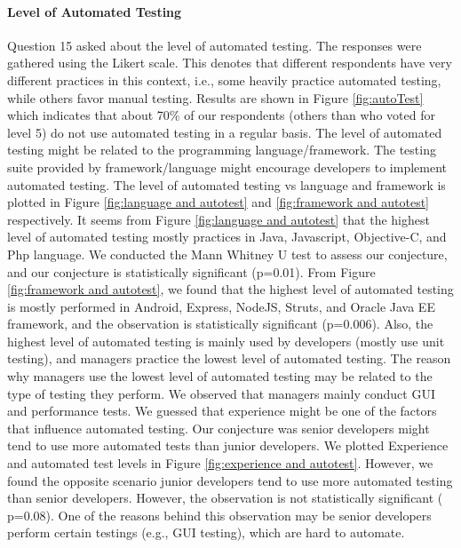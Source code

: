\paragraph{Level of Automated Testing}
Question 15 asked about the level of automated testing. The responses were gathered using the Likert scale. This denotes that different respondents have very different practices in this context, i.e., some heavily practice automated testing, while others favor manual testing.  Results are shown in Figure \ref{fig:autoTest} which indicates that about 70\% of our respondents (others than who voted for level 5) do not use automated testing in a regular basis. The level of automated testing might be related to the programming language/framework. The testing suite provided by framework/language might encourage developers to implement automated testing. The level of automated testing vs language and framework is plotted in Figure \ref{fig:language and autotest} and \ref{fig:framework and autotest} respectively. It seems from Figure \ref{fig:language and autotest} that the highest level of automated testing mostly practices in Java, Javascript, Objective-C, and Php language. We conducted the Mann Whitney U test to assess our conjecture, and our conjecture is statistically significant (p=0.01). From Figure \ref{fig:framework and autotest}, we found that the highest level of automated testing is mostly performed in Android, Express, NodeJS, Struts, and Oracle Java EE framework, and the observation is statistically significant (p=0.006). Also, the highest level of automated testing is mainly used by developers (mostly use unit testing), and managers practice the lowest level of automated testing. The reason why managers use the lowest level of automated testing may be related to the type of testing they perform. We observed that managers mainly conduct GUI and performance tests. We guessed that experience might be one of the factors that influence automated testing. Our conjecture was senior developers might tend to use more automated tests than junior developers. We plotted Experience and automated test levels in Figure \ref{fig:experience and autotest}. However, we found the opposite scenario junior developers tend to use more automated testing than senior developers. However, the observation is not statistically significant ( p=0.08). One of the reasons behind this observation may be senior developers perform certain testings (e.g., GUI testing), which are hard to automate.

